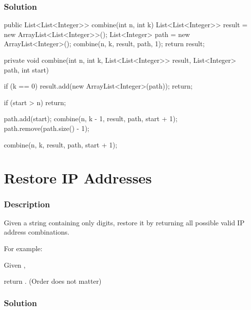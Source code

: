 \subsubsection{Solution}

\begin{Code}
public List<List<Integer>> combine(int n, int k) {
    List<List<Integer>> result = new ArrayList<List<Integer>>();
    List<Integer> path = new ArrayList<Integer>();
    combine(n, k, result, path, 1);
    return result;
}

private void combine(int n, int k, List<List<Integer>> result, List<Integer> path, int start) {
    if (k == 0) {
        result.add(new ArrayList<Integer>(path));
        return;
    }

    if (start > n) {
        return;
    }

    path.add(start);
    combine(n, k - 1, result, path, start + 1);
    path.remove(path.size() - 1);

    combine(n, k, result, path, start + 1);
}
\end{Code}

\newpage

\section{Restore IP Addresses} %

\subsubsection{Description}

Given a string containing only digits, restore it by returning all possible valid IP address combinations.

For example:

Given ,

return \code{["255.255.11.135", "255.255.111.35"]}. (Order does not matter)

\subsubsection{Solution}

\begin{Code}

\end{Code}